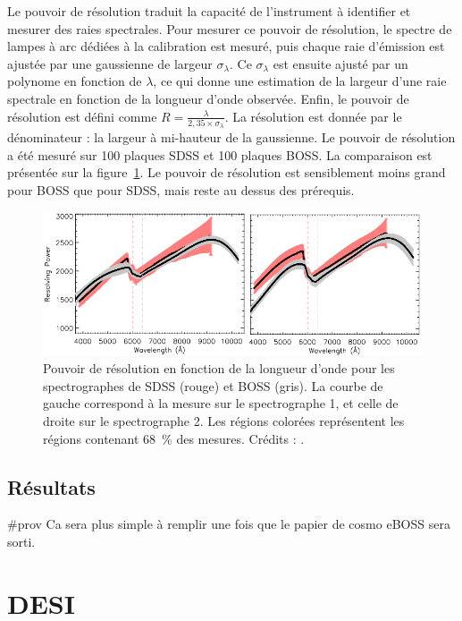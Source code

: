 \documentclass[11pt, twoside, a4paper, openright]{report}
\begin{document}
Le pouvoir de résolution traduit la capacité de l'instrument à identifier et mesurer des raies spectrales. Pour mesurer ce pouvoir de résolution, le spectre de lampes à arc dédiées à la calibration est mesuré, puis chaque raie d'émission est ajustée par une gaussienne de largeur $\sigma_\lambda$. Ce $\sigma_\lambda$ est ensuite ajusté par un polynome en fonction de $\lambda$, ce qui donne une estimation de la largeur d'une raie spectrale en fonction de la longueur d'onde observée. Enfin, le pouvoir de résolution est défini comme $R = \frac{\lambda}{2,35 \times \sigma_\lambda}$. La résolution est donnée par le dénominateur : la largeur à mi-hauteur de la gaussienne. Le pouvoir de résolution a été mesuré sur \num{100} plaques SDSS et \num{100} plaques BOSS. La comparaison est présentée sur la figure~\ref{fig:SpectroResoPower}. Le pouvoir de résolution est sensiblement moins grand pour BOSS que pour SDSS, mais reste au dessus des prérequis.
\begin{figure}
  \centering
  \includegraphics[scale=0.5]{SpectroResoPower}
  \caption{Pouvoir de résolution en fonction de la longueur d'onde pour les spectrographes de SDSS (rouge) et BOSS (gris). La courbe de gauche correspond à la mesure sur le spectrographe 1, et celle de droite sur le spectrographe 2. Les régions colorées représentent les régions contenant \SI{68}{\percent} des mesures. Crédits : \textcite{Smee2012}.}
  \label{fig:SpectroResoPower}
\end{figure}


\subsection{Résultats}

\#prov Ca sera plus simple à remplir une fois que le papier de cosmo eBOSS sera sorti.

\section{DESI}
\end{document}
